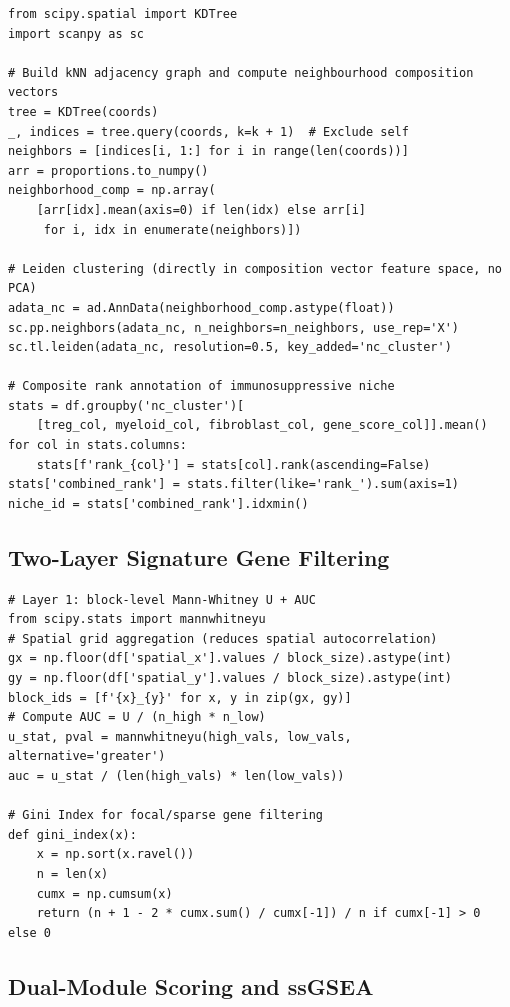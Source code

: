 \documentclass[12pt, a4paper]{article}
\begin{document}
\begin{lstlisting}[caption={Neighbourhood composition vector computation, Leiden clustering and composite rank annotation}]
from scipy.spatial import KDTree
import scanpy as sc

# Build kNN adjacency graph and compute neighbourhood composition vectors
tree = KDTree(coords)
_, indices = tree.query(coords, k=k + 1)  # Exclude self
neighbors = [indices[i, 1:] for i in range(len(coords))]
arr = proportions.to_numpy()
neighborhood_comp = np.array(
    [arr[idx].mean(axis=0) if len(idx) else arr[i]
     for i, idx in enumerate(neighbors)])

# Leiden clustering (directly in composition vector feature space, no PCA)
adata_nc = ad.AnnData(neighborhood_comp.astype(float))
sc.pp.neighbors(adata_nc, n_neighbors=n_neighbors, use_rep='X')
sc.tl.leiden(adata_nc, resolution=0.5, key_added='nc_cluster')

# Composite rank annotation of immunosuppressive niche
stats = df.groupby('nc_cluster')[
    [treg_col, myeloid_col, fibroblast_col, gene_score_col]].mean()
for col in stats.columns:
    stats[f'rank_{col}'] = stats[col].rank(ascending=False)
stats['combined_rank'] = stats.filter(like='rank_').sum(axis=1)
niche_id = stats['combined_rank'].idxmin()
\end{lstlisting}

\subsection{Two-Layer Signature Gene Filtering}

\begin{lstlisting}[caption={Layer 1 differential testing and AUC calculation}]
# Layer 1: block-level Mann-Whitney U + AUC
from scipy.stats import mannwhitneyu
# Spatial grid aggregation (reduces spatial autocorrelation)
gx = np.floor(df['spatial_x'].values / block_size).astype(int)
gy = np.floor(df['spatial_y'].values / block_size).astype(int)
block_ids = [f'{x}_{y}' for x, y in zip(gx, gy)]
# Compute AUC = U / (n_high * n_low)
u_stat, pval = mannwhitneyu(high_vals, low_vals, alternative='greater')
auc = u_stat / (len(high_vals) * len(low_vals))

# Gini Index for focal/sparse gene filtering
def gini_index(x):
    x = np.sort(x.ravel())
    n = len(x)
    cumx = np.cumsum(x)
    return (n + 1 - 2 * cumx.sum() / cumx[-1]) / n if cumx[-1] > 0 else 0
\end{lstlisting}

\subsection{Dual-Module Scoring and ssGSEA}
\end{document}
